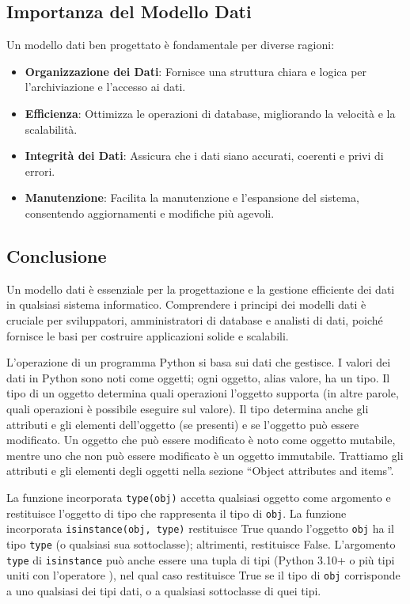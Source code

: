 \documentclass[
  letterpaper,
]{scrbook}
\providecommand{\tightlist}{%
  \setlength{\itemsep}{0pt}\setlength{\parskip}{0pt}}\usepackage{longtable,booktabs,array}
\begin{document}
\subsection{Importanza del Modello
Dati}\label{importanza-del-modello-dati}

Un modello dati ben progettato è fondamentale per diverse ragioni:

\begin{itemize}
\tightlist
\item
  \textbf{Organizzazione dei Dati}: Fornisce una struttura chiara e
  logica per l'archiviazione e l'accesso ai dati.
\item
  \textbf{Efficienza}: Ottimizza le operazioni di database, migliorando
  la velocità e la scalabilità.
\item
  \textbf{Integrità dei Dati}: Assicura che i dati siano accurati,
  coerenti e privi di errori.
\item
  \textbf{Manutenzione}: Facilita la manutenzione e l'espansione del
  sistema, consentendo aggiornamenti e modifiche più agevoli.
\end{itemize}

\subsection{Conclusione}\label{conclusione}

Un modello dati è essenziale per la progettazione e la gestione
efficiente dei dati in qualsiasi sistema informatico. Comprendere i
principi dei modelli dati è cruciale per sviluppatori, amministratori di
database e analisti di dati, poiché fornisce le basi per costruire
applicazioni solide e scalabili.

L'operazione di un programma Python si basa sui dati che gestisce. I
valori dei dati in Python sono noti come oggetti; ogni oggetto, alias
valore, ha un tipo. Il tipo di un oggetto determina quali operazioni
l'oggetto supporta (in altre parole, quali operazioni è possibile
eseguire sul valore). Il tipo determina anche gli attributi e gli
elementi dell'oggetto (se presenti) e se l'oggetto può essere
modificato. Un oggetto che può essere modificato è noto come oggetto
mutabile, mentre uno che non può essere modificato è un oggetto
immutabile. Trattiamo gli attributi e gli elementi degli oggetti nella
sezione ``Object attributes and items''.

La funzione incorporata \texttt{type(obj)} accetta qualsiasi oggetto
come argomento e restituisce l'oggetto di tipo che rappresenta il tipo
di \texttt{obj}. La funzione incorporata \texttt{isinstance(obj,\ type)}
restituisce True quando l'oggetto \texttt{obj} ha il tipo \texttt{type}
(o qualsiasi sua sottoclasse); altrimenti, restituisce False.
L'argomento \texttt{type} di \texttt{isinstance} può anche essere una
tupla di tipi (Python 3.10+ o più tipi uniti con l'operatore
\texttt{\textbar{}}), nel qual caso restituisce True se il tipo di
\texttt{obj} corrisponde a uno qualsiasi dei tipi dati, o a qualsiasi
sottoclasse di quei tipi.
\end{document}
